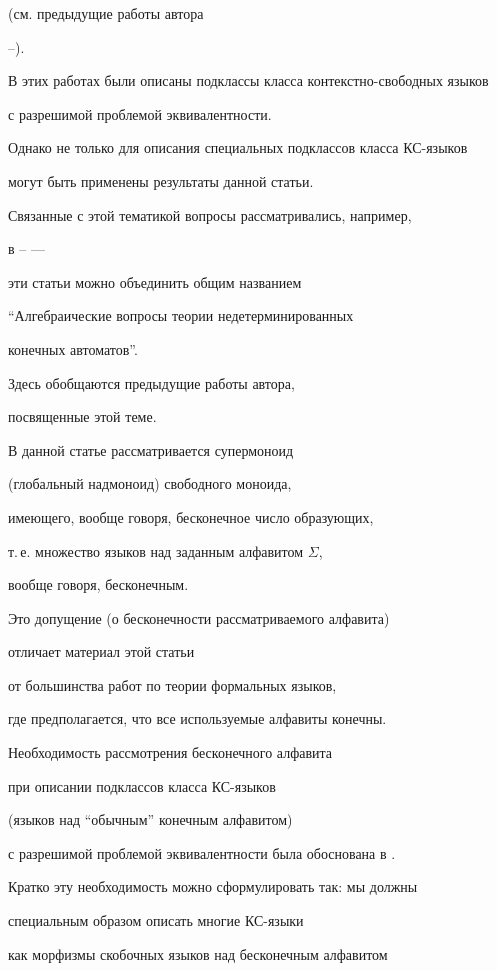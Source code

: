 (см. предыдущие работы автора


 \cite{io13}--\cite{mema}).


 В этих работах были описаны подклассы класса контекстно-свободных языков


 с разрешимой проблемой эквивалентности.


 Однако не только для описания специальных подклассов класса КС-языков


 могут быть применены результаты данной статьи.


 Связанные с этой тематикой вопросы рассматривались, например,


 в \cite{io31}--\cite{io42} ---


 эти статьи можно объединить общим названием


``Алгебраические вопросы теории недетерминированных


 конечных автоматов''.


Здесь обобщаются предыдущие работы автора,


 посвященные этой теме.





 В данной статье рассматривается супермоноид


 (глобальный надмоноид) свободного моноида,


 имеющего, вообще говоря, бесконечное число образующих,


 т.\,е. множество языков над заданным алфавитом $\Sigma$,


 вообще говоря, бесконечным.


 Это допущение (о бесконечности рассматриваемого алфавита)


 отличает материал этой статьи


 от большинства работ по теории формальных языков,


 где предполагается, что все используемые алфавиты конечны.


 Необходимость рассмотрения бесконечного алфавита


 при описании подклассов класса КС-языков


 (языков над ``обычным'' конечным алфавитом)


 с разрешимой проблемой эквивалентности была обоснована в \cite{medu}.


 Кратко эту необходимость можно сформулировать так: мы должны


специальным образом описать многие КС-языки


 как морфизмы скобочных языков над бесконечным алфавитом


